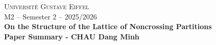 \documentclass[11pt,a4paper]{article}
\begin{document}
\begin{center}

  \textsc{Universit\'e Gustave Eiffel} \hfill  \,\\
  M2 -- Semester 2 -- 2025/2026 \hfill \, \\
  \vspace{0.5cm}
  {\bf
    \Large On the Structure of the Lattice of Noncrossing Partitions\\
    \vspace{0.2cm}
    \normalsize Paper Summary - CHAU Dang Minh
  }
\end{center}

\vspace{0.5cm}


\end{document}

